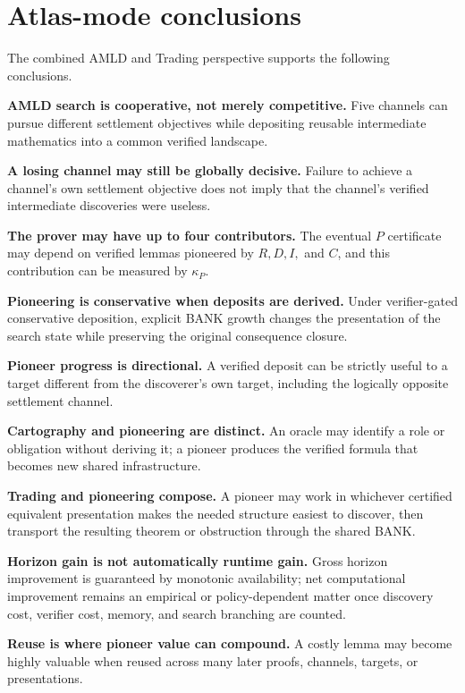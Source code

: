 \documentclass[11pt]{article}
\theoremstyle{remark}
\begin{document}
\section{Atlas-mode conclusions}
The combined AMLD and Trading perspective supports the following conclusions.
\begin{description}[leftmargin=1.2cm,style=nextline]
\item[A1.] \textbf{AMLD search is cooperative, not merely competitive.} Five channels can pursue different settlement objectives while depositing reusable intermediate mathematics into a common verified landscape.
\item[A2.] \textbf{A losing channel may still be globally decisive.} Failure to achieve a channel's own settlement objective does not imply that the channel's verified intermediate discoveries were useless.
\item[A3.] \textbf{The prover may have up to four contributors.} The eventual $P$ certificate may depend on verified lemmas pioneered by $R,D,I,$ and $C$, and this contribution can be measured by $\kappa_P$.
\item[A4.] \textbf{Pioneering is conservative when deposits are derived.} Under verifier-gated conservative deposition, explicit BANK growth changes the presentation of the search state while preserving the original consequence closure.
\item[A5.] \textbf{Pioneer progress is directional.} A verified deposit can be strictly useful to a target different from the discoverer's own target, including the logically opposite settlement channel.
\item[A6.] \textbf{Cartography and pioneering are distinct.} An oracle may identify a role or obligation without deriving it; a pioneer produces the verified formula that becomes new shared infrastructure.
\item[A7.] \textbf{Trading and pioneering compose.} A pioneer may work in whichever certified equivalent presentation makes the needed structure easiest to discover, then transport the resulting theorem or obstruction through the shared BANK.
\item[A8.] \textbf{Horizon gain is not automatically runtime gain.} Gross horizon improvement is guaranteed by monotonic availability; net computational improvement remains an empirical or policy-dependent matter once discovery cost, verifier cost, memory, and search branching are counted.
\item[A9.] \textbf{Reuse is where pioneer value can compound.} A costly lemma may become highly valuable when reused across many later proofs, channels, targets, or presentations.
\end{description}
\end{document}

